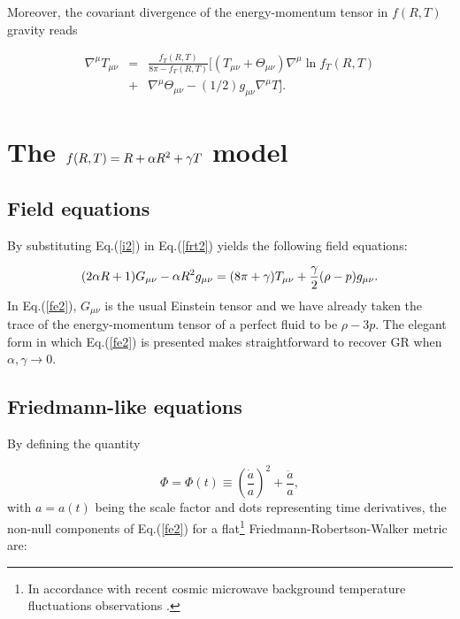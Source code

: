 Moreover, the covariant divergence of the energy-momentum tensor in $f(R,T)$ gravity reads \cite{alvarenga/2013,barrientos/2014}

\begin{eqnarray}\label{frt3}
\nabla^{\mu}T_{\mu\nu}&=&\frac{f_T(R,T)}{8\pi-f_T(R,T)}[(T_{\mu\nu}+\Theta_{\mu\nu})\nabla^{\mu}\ln f_T(R,T)\nonumber\\
&+&\nabla^{\mu}\Theta_{\mu\nu}-(1/2)g_{\mu\nu}\nabla^{\mu}T].
\end{eqnarray}

\section{The $f(R,T)=R+\protect\alpha R^{2}+\protect\gamma T$ model}

\label{sec:rar2lt}

\subsection{Field equations}

\label{ss:fes}

By substituting Eq.(\ref{i2}) in Eq.(\ref{frt2}) yields the following field
equations:

\begin{equation}  \label{fe2}
(2\alpha R+1)G_{\mu\nu}-\alpha R^{2}g_{\mu\nu}=(8\pi+\gamma)T_{\mu\nu}+\frac{%
\gamma}{2}(\rho-p)g_{\mu\nu}.
\end{equation}
In Eq.(\ref{fe2}), $G_{\mu\nu}$ is the usual Einstein tensor and we have
already taken the trace of the energy-momentum tensor of a perfect fluid to
be $\rho-3p$. The elegant form in which Eq.(\ref{fe2}) is presented makes
straightforward to recover GR when $\alpha,\gamma\rightarrow0$.

\subsection{Friedmann-like equations}

\label{ss:fle}

By defining the quantity

\begin{equation}
\Phi=\Phi(t)\equiv\left(\frac{\dot{a}}{a}\right)^{2}+\frac{\ddot{a}}{a},
\label{1}
\end{equation}
with $a=a(t)$ being the scale factor and dots representing time derivatives,
the non-null components of Eq.(\ref{fe2}) for a flat\footnote{%
In accordance with recent cosmic microwave background temperature
fluctuations observations \cite{hinshaw/2013}.} Friedmann-Robertson-Walker
metric are:

